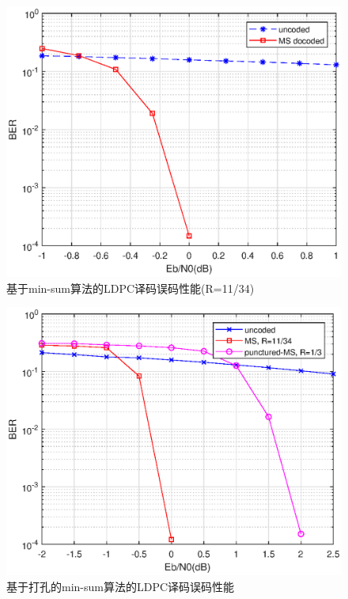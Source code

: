 \documentclass{article}
\begin{document}
\begin{figure}[H]
	\centering
	\includegraphics[width = .8\textwidth]{ms.eps}
	\caption{基于min-sum算法的LDPC译码误码性能(R=11/34)}
\end{figure}

\begin{figure}[H]
	\centering
	\includegraphics[width = .8\textwidth]{pun.eps}
	\caption{基于打孔的min-sum算法的LDPC译码误码性能}
\end{figure}
\end{document}
